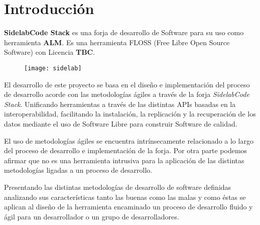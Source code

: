 %
% 

\chapter{Introducci\'on}
\label{chap:introduccion}

\par \textbf{SidelabCode Stack} es una forja de desarrollo de Software para su uso como herramienta \textbf{ALM}. Es una herramienta FLOSS (Free Libre Open Source Software) con Licencia \textbf{TBC}.

\begin{figure}[h]
    \begin{center}	
        \texttt{[image: sidelab]}
        \label{fig:sidelab}
    \end{center}
\end{figure}

\par El desarrollo de este proyecto se basa en el dise\~no e implementaci\'on del proceso de desarrollo acorde con las metodolog\'ias \'agiles a trav\'es de la forja \emph{SidelabCode Stack}. Unificando herramientas a trav\'es de las distintas APIs basadas en la interoperabilidad, facilitando la instalaci\'on, la replicaci\'on y la recuperaci\'on de los datos mediante el uso de Software Libre para construir Software de calidad.

\par El uso de metodolog\'ias \'agiles se encuentra intr\'insecamente relacionado a lo largo del proceso de desarrollo e implementaci\'on de la forja. Por otra parte podemos afirmar que no es una herramienta intrusiva para la aplicaci\'on de las distintas metodolog\'ias ligadas a un proceso de desarrollo.

\par Presentando las distintas metodolog\'ias de desarrollo de software definidas analizando sus caracter\'isticas tanto las buenas como las malas y como \'estas se aplican al dise\~no de la herramienta encaminado un proceso de desarrollo fluido y \'agil para un desarrollador o un grupo de desarrolladores.

